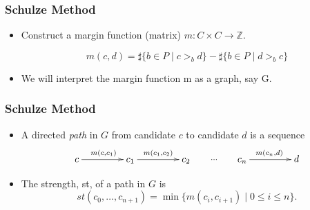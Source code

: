 \documentclass{beamer}
\begin{document}
\begin{frame}
\frametitle{Schulze Method}
\begin{itemize}

\item Construct a margin function (matrix) $m: C \times C \to \mathbb{Z}$. 

\[
  m(c, d) = \sharp \lbrace b \in P \mid c >_b d \rbrace -
            \sharp \lbrace b \in P \mid d >_b c \rbrace
\] 
\item We will interpret the margin function m as a graph, say G.
\end{itemize}
\end{frame}



\begin{frame}
\frametitle{Schulze Method}
\begin{itemize}

\item A directed \emph{path} in $G$ from
candidate $c$ to candidate $d$ is a sequence 
 \[\xymatrix@C=10ex{ c  \ar[r]^{m(c, c_1)} & c_1   \ar[r]^{m(c_1,c_2)} & c_2 \ar@{}[r]|{\dots} & c_{n}   \ar[r]^{m(c_{n}, d)} & d } \]

\item The strength, st, of a path in $G$ is
\[ st(c_0, \dots, c_{n+1}) = \min \lbrace m (c_i, c_{i+1}) \mid 0
\leq i \leq n \rbrace. \]
%
%

\end{itemize}
\end{frame}
\end{document}
